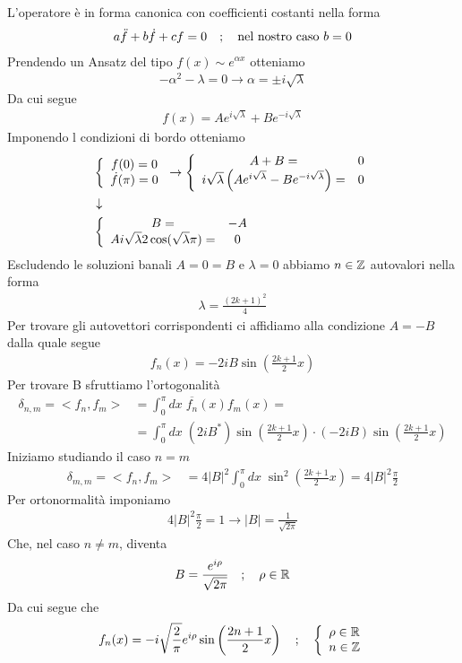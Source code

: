 L'operatore è in forma canonica con coefficienti costanti nella forma
\begin{align}
	a \ddot{f} + b \dot{f} + cf=0 \quad ; \quad \text{nel nostro caso } b=0
\end{align}
Prendendo un Ansatz del tipo $f(x) \sim e^{\alpha x}$ otteniamo
\begin{align}
	-\alpha^2 - \lambda =0 \to \alpha= \pm i \sqrt{\lambda}
\end{align}
Da cui segue
\begin{align}
	f(x) = A e^{i \sqrt{\lambda}} + B e^{-i \sqrt{\lambda}}
\end{align}
Imponendo l condizioni di bordo otteniamo
\begin{align}
	&\left\{ \begin{array}{cc} f(0) =0\\ \dot{f}(\pi) =0 \end{array} \right. \to \left\{ \begin{array}{cc} A+B = &0\\ i\sqrt{\lambda} \left(A e^{i \sqrt{\lambda}} - B e^{-i \sqrt{\lambda}}\right) = &0 \end{array} \right. \\ &\downarrow \nonumber \\
	&\left\{ \begin{array}{cc} B = &-A\\ Ai \sqrt{\lambda} 2 \cos(\sqrt{\lambda} \pi) =&0 \end{array} \right.
\end{align}
Escludendo le soluzioni banali $A=0=B$ e $\lambda=0$ abbiamo $n\in\mathbb{Z}$ autovalori nella forma
\begin{align}
	\lambda = \frac{(2k+1)^2}{4}
\end{align}
Per trovare gli autovettori corrispondenti ci affidiamo alla condizione $A = -B$ dalla quale segue
\begin{align}
	f_n(x)=-2i B \sin\left(\frac{2k+1}{2} x\right)
\end{align}
Per trovare B sfruttiamo l'ortogonalità
\begin{align}
	\delta_{n,m} = <f_n,f_m> &= \int_{0}^{\pi} dx \; \overline{f_n}(x) f_m(x) = \nonumber \\
	&= \int_0^\pi dx\; (2i B^*) \sin\left(\frac{2k+1}{2} x\right) \cdot (-2i B) \sin\left(\frac{2k+1}{2} x\right)
\end{align}
Iniziamo studiando il caso $n=m$
\begin{align}
	\delta_{m,m} = <f_n,f_m> &= 4|B|^2 \int_0^\pi dx\; \sin^2\left(\frac{2k+1}{2} x\right) = 4|B|^2 \frac{\pi}{2}
\end{align}
Per ortonormalità imponiamo
\begin{align}
	4|B|^2 \frac{\pi}{2} = 1 \to |B| = \frac{1}{\sqrt{2\pi}} 
\end{align}
Che, nel caso $n\neq m$, diventa 	
\begin{align}
	B = \frac{e^{i\rho}}{\sqrt{2\pi}} \quad ; \quad \rho \in \mathbb{R}	
\end{align}
Da cui segue che
\begin{align}
	f_n(x) = -i \sqrt{\frac{2}{\pi}}e^{i\rho}\sin \left( \frac{2n+1}{2}x \right) \quad ; \quad \left\{ \begin{array}{cc} \rho \in \mathbb{R}\\ n\in\mathbb{Z} \end{array} \right.
\end{align}

